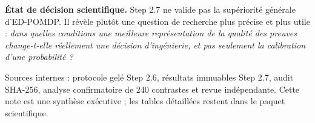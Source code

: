 \documentclass[11pt,a4paper]{article}
\begin{document}
\begin{tcolorbox}[colback=softblue,colframe=deepblue,boxrule=0.7pt,arc=2mm]
\textbf{État de décision scientifique.} Step 2.7 ne valide pas la supériorité générale d'ED-POMDP. Il révèle plutôt une question de recherche plus précise et plus utile : \emph{dans quelles conditions une meilleure représentation de la qualité des preuves change-t-elle réellement une décision d'ingénierie, et pas seulement la calibration d'une probabilité ?}
\end{tcolorbox}

\vfill
{\small\color{muted}Sources internes : protocole gelé Step 2.6, résultats immuables Step 2.7, audit SHA-256, analyse confirmatoire de 240 contrastes et revue indépendante. Cette note est une synthèse exécutive ; les tables détaillées restent dans le paquet scientifique.}
\end{document}
